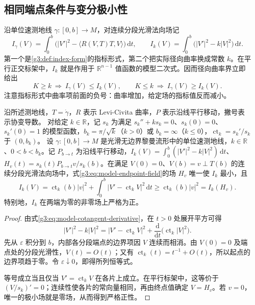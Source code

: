 \subsection{相同端点条件与变分极小性}
\label{g3:subsec:0701:02}

沿单位速测地线 \(\gamma:[0,b]\to M\)，对连续分段光滑法向场记
\[
	I_\gamma(V)=\int_0^b\bigl(|V'|^2-\langle R(V,T)T,V\rangle\bigr)\,\mathrm dt,
	\qquad
	I_k(V)=\int_0^b\bigl(|V'|^2-k|V|^2\bigr)\,\mathrm dt.
\]
第一个是\cref{g3:def:index-form}的指标形式，第二个把实际径向曲率换成常数 \(k\)。在平行正交标架中，\(I_k\) 就是作用于 \(\mathbb R^{n-1}\) 值函数的模型二次式。因而径向曲率界立即给出
\begin{equation}\label{g3:eq:curvature-index-order}
	K\ge k\ \Longrightarrow\ I_\gamma(V)\le I_k(V),
	\qquad
	K\le k\ \Longrightarrow\ I_\gamma(V)\ge I_k(V).
\end{equation}
注意指标形式中曲率项前面的负号：曲率增加，给定场的指标值反而减小。

\begin{lemma}\label{g3:lem:model-index-minimum}
	沿所述测地线，\(T=\dot\gamma\)，\(R\) 表示 Levi-Civita 曲率，\(P\) 表示沿线平行移动，撇号表示协变导数。
	对给定 \(k\in\mathbb R\)，记 \(s_k\) 为满足 \(s_k''+ks_k=0\)、\(s_k(0)=0\)、\(s_k'(0)=1\) 的模型函数，\(b_k=\pi/\sqrt k\)（\(k>0\)）或 \(b_k=\infty\)（\(k\le0\)），\(\operatorname{ct}_k=s_k'/s_k\) 于 \((0,b_k)\)。
	设 \(\gamma:[0,b]\to M\) 是光滑无边界黎曼流形中的单位速测地线，\(k\in\mathbb R\)、\(0<b<b_k\)。记 \(P_{b\to t}\) 为沿线平行移动，\(I_k(V)=\int_0^b(|V'|^2-k|V|^2)\,\mathrm dt\)、\(H_v(t)=s_k(t)P_{b\to t}v/s_k(b)\)。在满足 \(V(0)=0\)、\(V(b)=v\perp T(b)\) 的连续分段光滑法向场中，式\eqref{g3:eq:model-endpoint-field}的场 \(H_v\) 唯一使 \(I_k\) 最小，且
	\begin{equation}\label{g3:eq:model-index-minimum}
		I_k(V)=\operatorname{ct}_k(b)|v|^2
		+\int_0^b|V'-\operatorname{ct}_kV|^2\,\mathrm dt
		\ge\operatorname{ct}_k(b)|v|^2=I_k(H_v).
	\end{equation}
	特别地，\(I_k\) 在两端为零的非零场上严格为正。
\end{lemma}
\begin{proof}
	由式\eqref{g3:eq:model-cotangent-derivative}，在 \(t>0\) 处展开平方可得
	\[
		|V'|^2-k|V|^2
		=|V'-\operatorname{ct}_kV|^2
		+\frac{\mathrm d}{\mathrm dt}
		\bigl(\operatorname{ct}_k|V|^2\bigr).
	\]
	先从 \(\varepsilon\) 积分到 \(b\)，内部各分段端点的边界项因 \(V\) 连续而相消。由 \(V(0)=0\) 及端点处的分段光滑性，\(V(t)=O(t)\)；又有 \(\operatorname{ct}_k(t)=t^{-1}+O(t)\)，所以起点的边界项趋于零。令 \(\varepsilon\downarrow0\)，即得所列恒等式。

	等号成立当且仅当 \(V'=\operatorname{ct}_kV\) 在各片上成立。在平行标架中，这等价于 \((V/s_k)'=0\)；连续性使各片的常向量相同，再由终点值确定 \(V=H_v\)。若 \(v=0\)，唯一的极小场就是零场，从而得到严格正性。
\end{proof}

